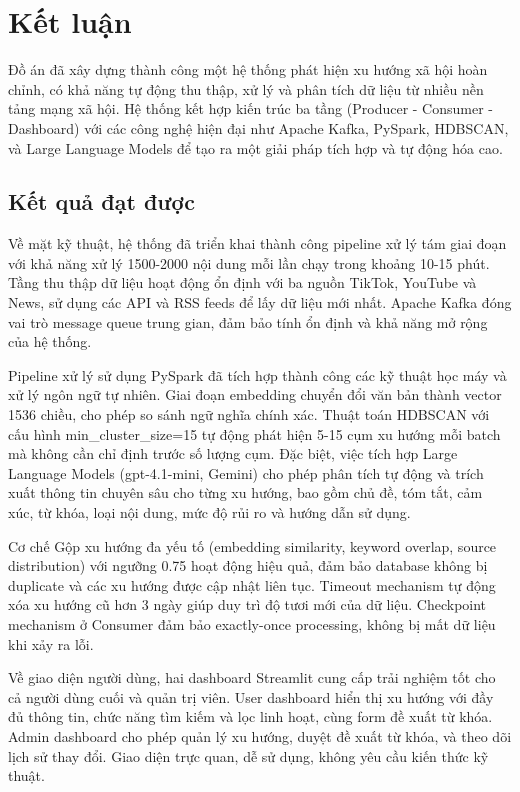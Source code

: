
\chapter{Kết luận}

Đồ án đã xây dựng thành công một hệ thống phát hiện xu hướng xã hội hoàn chỉnh, có khả năng tự động thu thập, xử lý và phân tích dữ liệu từ nhiều nền tảng mạng xã hội. Hệ thống kết hợp kiến trúc ba tầng (Producer - Consumer - Dashboard) với các công nghệ hiện đại như Apache Kafka, PySpark, HDBSCAN, và Large Language Models để tạo ra một giải pháp tích hợp và tự động hóa cao.

\section{Kết quả đạt được}

Về mặt kỹ thuật, hệ thống đã triển khai thành công pipeline xử lý tám giai đoạn với khả năng xử lý 1500-2000 nội dung mỗi lần chạy trong khoảng 10-15 phút. Tầng thu thập dữ liệu hoạt động ổn định với ba nguồn TikTok, YouTube và News, sử dụng các API và RSS feeds để lấy dữ liệu mới nhất. Apache Kafka đóng vai trò message queue trung gian, đảm bảo tính ổn định và khả năng mở rộng của hệ thống.

Pipeline xử lý sử dụng PySpark đã tích hợp thành công các kỹ thuật học máy và xử lý ngôn ngữ tự nhiên. Giai đoạn embedding chuyển đổi văn bản thành vector 1536 chiều, cho phép so sánh ngữ nghĩa chính xác. Thuật toán HDBSCAN với cấu hình min\_cluster\_size=15 tự động phát hiện 5-15 cụm xu hướng mỗi batch mà không cần chỉ định trước số lượng cụm. Đặc biệt, việc tích hợp Large Language Models (gpt-4.1-mini, Gemini) cho phép phân tích tự động và trích xuất thông tin chuyên sâu cho từng xu hướng, bao gồm chủ đề, tóm tắt, cảm xúc, từ khóa, loại nội dung, mức độ rủi ro và hướng dẫn sử dụng.

Cơ chế Gộp xu hướng đa yếu tố (embedding similarity, keyword overlap, source distribution) với ngưỡng 0.75 hoạt động hiệu quả, đảm bảo database không bị duplicate và các xu hướng được cập nhật liên tục. Timeout mechanism tự động xóa xu hướng cũ hơn 3 ngày giúp duy trì độ tươi mới của dữ liệu. Checkpoint mechanism ở Consumer đảm bảo exactly-once processing, không bị mất dữ liệu khi xảy ra lỗi.

Về giao diện người dùng, hai dashboard Streamlit cung cấp trải nghiệm tốt cho cả người dùng cuối và quản trị viên. User dashboard hiển thị xu hướng với đầy đủ thông tin, chức năng tìm kiếm và lọc linh hoạt, cùng form đề xuất từ khóa. Admin dashboard cho phép quản lý xu hướng, duyệt đề xuất từ khóa, và theo dõi lịch sử thay đổi. Giao diện trực quan, dễ sử dụng, không yêu cầu kiến thức kỹ thuật.

